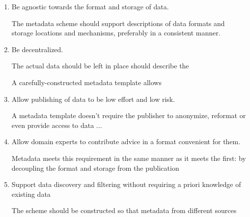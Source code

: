 \begin{enumerate}
\item Be agnostic towards the format and storage of data.

      The metadata scheme should support descriptions of data 
      formats and storage locations and mechanisms, preferably in a
      consistent manner.

\item Be decentralized.

	  The actual data should be left in place should describe the 

A carefully-constructed metadata template allows 

\item Allow publishing of data to be low effort and low risk.

      A metadata template doesn't require the publisher to anonymize,
      reformat or even provide access to data ...

\item Allow domain experts to contribute advice in a format convenient for them.

      Metadata meets this requirement in the same manner as it meets the first:
      by decoupling the format and storage from the publication 

\item Support data discovery and filtering without requiring a 
      priori knowledge of existing data
      
      The scheme should be constructed so that metadata from
      different sources 
\end{enumerate}















